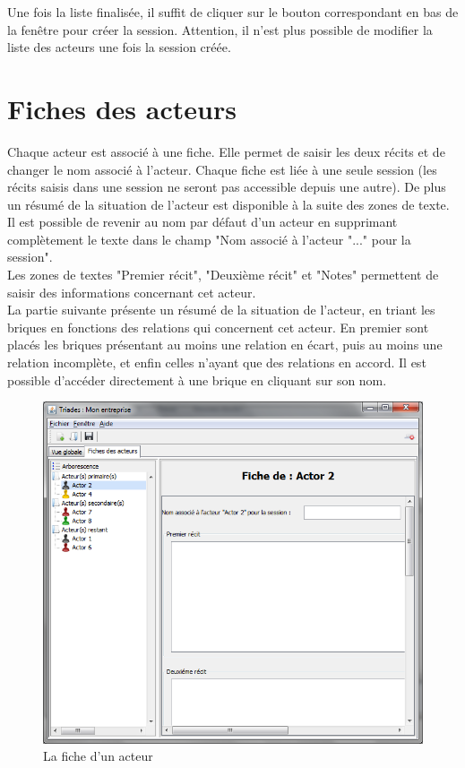 Une fois la liste finalisée, il suffit de cliquer sur le bouton correspondant en bas de la fenêtre pour créer la session. Attention, il n'est plus possible de modifier la liste des acteurs une fois la session créée.\\

\section{Fiches des acteurs}
\label{fiche_acteur}
Chaque acteur est associé à une fiche. Elle permet de saisir les deux récits et de changer le nom associé à l'acteur. Chaque fiche est liée à une seule session (les récits saisis dans une session ne seront pas accessible depuis une autre). De plus un résumé de la situation de l'acteur est disponible à la suite des zones de texte.\\

Il est possible de revenir au nom par défaut d'un acteur en supprimant complètement le texte dans le champ "Nom associé à l'acteur "..." pour la session".\\

Les zones de textes "Premier récit", "Deuxième récit" et "Notes" permettent de saisir des informations concernant cet acteur.\\

La partie suivante présente un résumé de la situation de l'acteur, en triant les briques en fonctions des relations qui concernent cet acteur. En premier sont placés les briques présentant au moins une relation en écart, puis au moins une relation incomplète, et enfin celles n'ayant que des relations en accord. Il est possible d'accéder directement à une brique en cliquant sur son nom.\\

\begin{figure}[h!t]
\centering

\includegraphics[width=12cm]{images/fiche_acteur.png}

\caption{La fiche d'un acteur}

\end{figure}

